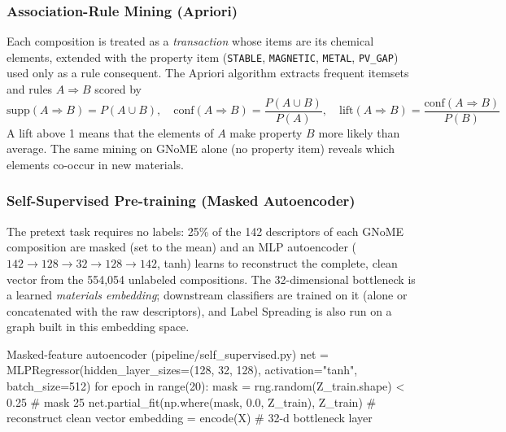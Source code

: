 \subsubsection{Association-Rule Mining (Apriori)}
Each composition is treated as a \emph{transaction} whose items are its chemical elements,
extended with the property item (\texttt{STABLE}, \texttt{MAGNETIC}, \texttt{METAL},
\texttt{PV\_GAP}) used only as a rule consequent. The Apriori algorithm extracts frequent
itemsets and rules $A \Rightarrow B$ scored by
\[
\text{supp}(A\Rightarrow B) = P(A \cup B),\quad
\text{conf}(A\Rightarrow B) = \frac{P(A \cup B)}{P(A)},\quad
\text{lift}(A\Rightarrow B) = \frac{\text{conf}(A\Rightarrow B)}{P(B)}
\]
A lift above 1 means that the elements of $A$ make property $B$ more likely than average. The
same mining on GNoME alone (no property item) reveals which elements co-occur in new materials.

\subsubsection{Self-Supervised Pre-training (Masked Autoencoder)}
The pretext task requires no labels: 25\% of the 142 descriptors of each GNoME composition are
masked (set to the mean) and an MLP autoencoder
($142 \rightarrow 128 \rightarrow 32 \rightarrow 128 \rightarrow 142$, tanh) learns to
reconstruct the complete, clean vector from the 554,054 unlabeled compositions. The
32-dimensional bottleneck is a learned \emph{materials embedding}; downstream classifiers are
trained on it (alone or concatenated with the raw descriptors), and Label Spreading is also run
on a graph built in this embedding space.

\begin{pycode}{Masked-feature autoencoder (pipeline/self\_supervised.py)}
net = MLPRegressor(hidden_layer_sizes=(128, 32, 128), activation="tanh", batch_size=512)
for epoch in range(20):
    mask = rng.random(Z_train.shape) < 0.25          # mask 25 %
    net.partial_fit(np.where(mask, 0.0, Z_train), Z_train)   # reconstruct clean vector
embedding = encode(X)                                   # 32-d bottleneck layer
\end{pycode}
